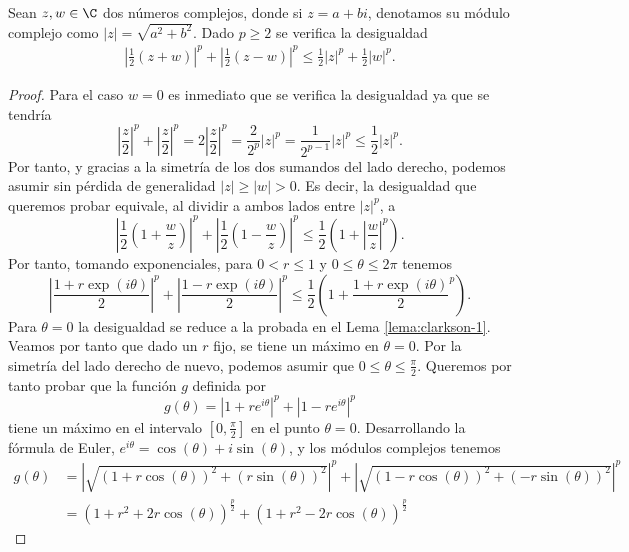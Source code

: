 \begin{lemma} \label{lema:clarkson-2}
    Sean $ z, w \in \C $ dos números complejos, donde si $ z = a + bi $, denotamos su módulo complejo como $|z| = \sqrt{a^2 + b^2} $. Dado $ p \geq 2 $ se verifica la desigualdad
    \begin{align}
        \left| \frac{1}{2}(z+w)\right|^p + \left| \frac{1}{2}(z-w)\right|^p \leq \frac{1}{2} |z|^p + \frac{1}{2} |w|^p.
    \end{align}
\end{lemma}
\begin{proof}
    Para el caso $ w = 0 $ es inmediato que se verifica la desigualdad ya que se tendría
    $$
        \left| \frac{z}{2}\right|^p + \left| \frac{z}{2}\right|^p = 2\left|\frac{z}{2}\right|^p = \frac{2}{2^p}\left|z\right|^p = \frac{1}{2^{p-1}}\left|z\right|^p \leq \frac{1}{2}\left|z\right|^p.
    $$
    Por tanto, y gracias a la simetría de los dos sumandos del lado derecho, podemos asumir sin pérdida de generalidad $ |z| \geq |w| > 0 $. Es decir, la desigualdad que queremos probar equivale, al dividir a ambos lados entre $ |z|^p $, a
    $$
        \left| \frac{1}{2}(1+\frac{w}{z})\right|^p + \left| \frac{1}{2}(1-\frac{w}{z})\right|^p \leq \frac{1}{2}\left(1 + \left|\frac{w}{z} \right|^p \right).
    $$
    Por tanto, tomando exponenciales, para $ 0 < r \leq 1 $ y $ 0 \leq \theta \leq 2 \pi $ tenemos
    $$
        \left| \frac{1+r \exp (i \theta)}{2} \right|^p + \left| \frac{1-r \exp (i \theta)}{2} \right|^p \leq \frac{1}{2}\left(1 + \frac{1+r \exp (i \theta)}{2}^p \right).
    $$
    Para $ \theta = 0 $ la desigualdad se reduce a la probada en el Lema \ref{lema:clarkson-1}. Veamos por tanto que dado un $ r $ fijo, se tiene un máximo en $ \theta = 0 $. Por la simetría del lado derecho de nuevo, podemos asumir que $ 0 \leq \theta \leq \frac{\pi}{2} $. Queremos por tanto probar que la función $g$ definida por
    $$
        g(\theta) = |1 + re^{i\theta}|^p + |1 - re^{i\theta}|^p
    $$
    tiene un máximo en el intervalo $[0, \frac{\pi}{2}] $ en el punto $ \theta = 0 $. Desarrollando la fórmula de Euler, $ e^{i\theta} = \cos(\theta) + i\sin(\theta)$,  y los módulos complejos tenemos
    \begin{align}
        g(\theta) &= \left|\sqrt{(1 + r \cos(\theta))^2 + (r\sin(\theta))^2} \right|^p + \left|\sqrt{(1 - r \cos(\theta))^2 + (- r\sin(\theta))^2} \right|^p \\
        &= (1 + r^2 + 2r\cos(\theta))^\frac{p}{2} + (1 + r^2 - 2r\cos(\theta))^\frac{p}{2}
    \end{align}

\end{proof}

